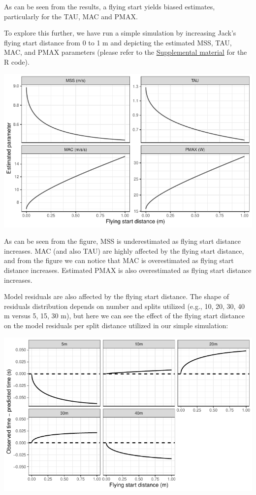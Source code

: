 \documentclass[fleqn,10pt]{wlpeerj} %
\begin{document}
\normalsize

As can be seen from the results, a flying start yields biased estimates, particularly for the TAU, MAC and PMAX.

To explore this further, we have run a simple simulation by increasing Jack's flying start distance from 0 to 1 m and depicting the estimated MSS, TAU, MAC, and PMAX parameters (please refer to the \protect\hyperlink{supplemental-material}{Supplemental material} for the R code).

\small

\begin{center}\includegraphics[width=0.9\linewidth]{paper_files/figure-latex/unnamed-chunk-29-1} \end{center}

\normalsize

As can be seen from the figure, MSS is underestimated as flying start distance increases. MAC (and also TAU) are highly affected by the flying start distance, and from the figure we can notice that MAC is overestimated as flying start distance increases. Estimated PMAX is also overestimated as flying start distance increases.

Model residuals are also affected by the flying start distance. The shape of residuals distribution depends on number and splits utilized (e.g., 10, 20, 30, 40 m versus 5, 15, 30 m), but here we can see the effect of the flying start distance on the model residuals per split distance utilized in our simple simulation:

\small

\begin{center}\includegraphics[width=0.9\linewidth]{paper_files/figure-latex/unnamed-chunk-30-1} \end{center}
\end{document}
